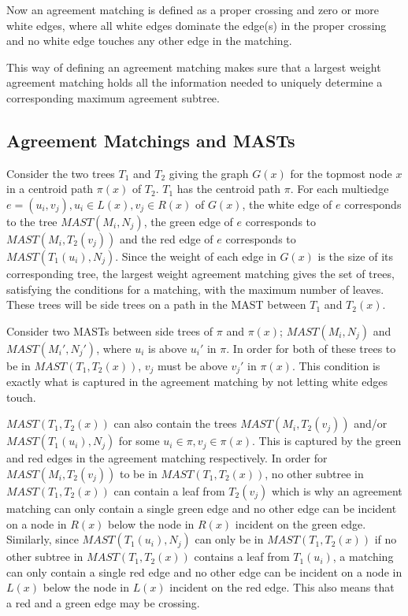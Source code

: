 Now an agreement matching is defined as a proper crossing and zero or more white edges, where all white edges dominate the edge(s) in the proper crossing and no white edge touches any other edge in the matching.

This way of defining an agreement matching makes sure that a largest weight agreement matching holds all the information needed to uniquely determine a corresponding maximum agreement subtree. 

\subsection{Agreement Matchings and MASTs}
Consider the two trees $T_1$ and $T_2$ giving the graph $G(x)$ for the topmost node $x$ in a centroid path $\pi(x)$ of $T_2$. $T_1$ has the centroid path $\pi$. For each multiedge $e = (u_i, v_j), u_i \in L(x), v_j \in R(x)$ of $G(x)$, the white edge of $e$ corresponds to the tree $MAST(M_i, N_j)$, the green edge of $e$ corresponds to $MAST(M_i, T_2(v_j))$ and the red edge of $e$ corresponds to $MAST(T_1(u_i), N_j)$. Since the weight of each edge in $G(x)$ is the size of its corresponding tree, the largest weight agreement matching gives the set of trees, satisfying the conditions for a matching, with the maximum number of leaves. These trees will be side trees on a path in the MAST between $T_1$ and $T_2(x)$.

Consider two MASTs between side trees of $\pi$ and $\pi(x)$; $MAST(M_i, N_j)$ and $MAST(M_i', N_j')$, where $u_i$ is above $u_i'$ in $\pi$. In order for both of these trees to be in $MAST(T_1, T_2(x))$, $v_j$ must be above $v_j'$ in $\pi(x)$. This condition is exactly what is captured in the agreement matching by not letting white edges touch.

$MAST(T_1, T_2(x))$ can also contain the trees $MAST(M_i, T_2(v_j))$ and/or $MAST(T_1(u_i), N_j)$ for some $u_i \in \pi, v_j \in \pi(x)$. This is captured by the green and red edges in the agreement matching respectively. In order for $MAST(M_i, T_2(v_j))$ to be in $MAST(T_1, T_2(x))$, no other subtree in $MAST(T_1, T_2(x))$ can contain a leaf from $T_2(v_j)$ which is why an agreement matching can only contain a single green edge and no other edge can be incident on a node in $R(x)$ below the node in $R(x)$ incident on the green edge. Similarly, since $MAST(T_1(u_i), N_j)$ can only be in $MAST(T_1, T_2(x))$ if no other subtree in $MAST(T_1, T_2(x))$ contains a leaf from $T_1(u_i)$, a matching can only contain a single red edge and no other edge can be incident on a node in $L(x)$ below the node in $L(x)$ incident on the red edge. This also means that a red and a green edge may be crossing.

